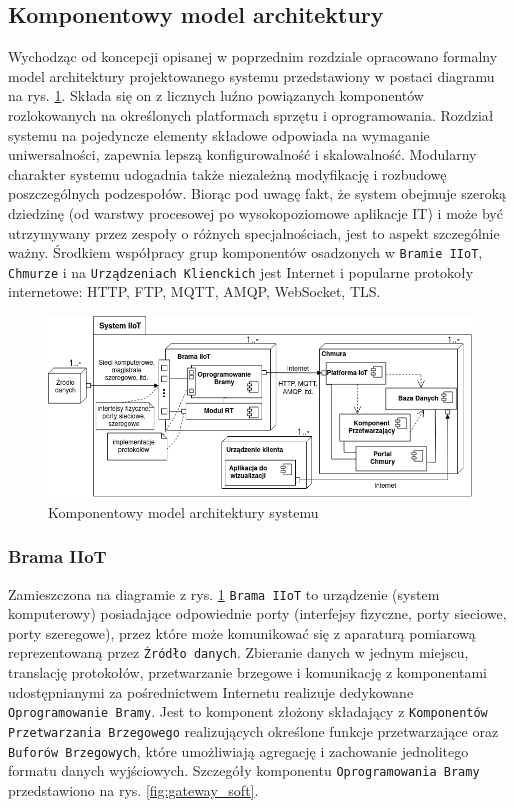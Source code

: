\documentclass[a4paper, 12pt, twoside]{article}
\begin{document}
\subsection{Komponentowy model architektury}\label{model-komp}

Wychodząc od koncepcji opisanej w poprzednim rozdziale opracowano
formalny model architektury projektowanego systemu przedstawiony
w postaci diagramu na rys. \ref{fig:arch}. Składa się on z licznych luźno
powiązanych komponentów rozlokowanych na określonych platformach sprzętu i oprogramowania.
Rozdział systemu na pojedyncze elementy składowe odpowiada na wymaganie uniwersalności, zapewnia
lepszą konfigurowalność i skalowalność. Modularny charakter systemu
udogadnia także niezależną modyfikację i rozbudowę poszczególnych podzespołów.
Biorąc pod uwagę fakt, że system obejmuje szeroką dziedzinę (od warstwy procesowej
po wysokopoziomowe aplikacje IT) i może być utrzymywany przez zespoły o różnych
specjalnościach, jest to aspekt szczególnie ważny. Środkiem współpracy
grup komponentów osadzonych w \texttt{Bramie IIoT}, \texttt{Chmurze} i na
\texttt{Urządzeniach Klienckich} jest
Internet i popularne protokoły internetowe: HTTP, FTP, MQTT, AMQP, WebSocket, TLS.

\begin{figure}[h]
      \centering
      \includegraphics[width=\textwidth]{arch.png}
      \caption{Komponentowy model architektury systemu}
      \label{fig:arch}
\end{figure}

\subsubsection{Brama IIoT}\label{brama-iot-general}

Zamieszczona na diagramie z rys. \ref{fig:arch} \texttt{Brama IIoT} to urządzenie (system komputerowy)
posiadające odpowiednie porty (interfejsy fizyczne, porty sieciowe, porty szeregowe),
przez które może komunikować się z aparaturą pomiarową reprezentowaną przez
\texttt{Źródło danych}. Zbieranie danych w jednym miejscu, translację protokołów,
przetwarzanie brzegowe i komunikację z komponentami udostępnianymi za pośrednictwem
Internetu realizuje dedykowane \texttt{Oprogramowanie Bramy}.
Jest to komponent złożony składający z \texttt{Komponentów Przetwarzania Brzegowego}
realizujących określone funkcje przetwarzające oraz \texttt{Buforów Brzegowych},
które umożliwiają agregację i zachowanie jednolitego formatu danych wyjściowych.
Szczegóły komponentu \texttt{Oprogramowania Bramy}
przedstawiono na rys. \ref{fig:gateway_soft}.
\end{document}
